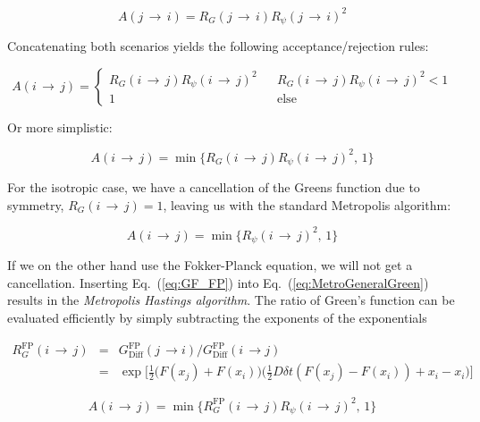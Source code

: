\begin{equation*}
 A(j\,\rightarrow\,i) = R_G(j\,\rightarrow\,i)R_\psi(j\,\rightarrow\,i)^2
\end{equation*}


Concatenating both scenarios yields the following acceptance/rejection rules:

\begin{equation}
\label{eq:MetroGeneralGreen}
 A(i\,\rightarrow\,j) = \left\{\begin{array}{ccc}
R_G(i\,\rightarrow\,j)R_\psi(i\,\rightarrow\,j)^2 & & R_G(i\,\rightarrow\,j)R_\psi(i\,\rightarrow\,j)^2 < 1\\
1  & & \mathrm{else}  \end{array}\right. 
\end{equation}

Or more simplistic:

\begin{equation}
  A(i\,\rightarrow\,j) = \min\{R_G(i\,\rightarrow\,j)R_\psi(i\,\rightarrow\,j)^2, \,1\}
\end{equation}


For the isotropic case, we have a cancellation of the Greens function due to symmetry, $R_G(i\,\rightarrow\,j) = 1$, leaving us with the standard Metropolis algorithm:

\begin{equation}
\label{eq:Metropolis_standard}
 A(i\,\rightarrow\,j) = \min\{R_\psi(i\,\rightarrow\,j)^2, \,1\}
\end{equation}

If we on the other hand use the Fokker-Planck equation, we will not get a cancellation. Inserting Eq.~(\ref{eq:GF_FP}) into Eq.~(\ref{eq:MetroGeneralGreen}) results in the \textit{Metropolis Hastings algorithm}. The ratio of Green's function can be evaluated efficiently by simply subtracting the exponents of the exponentials

\begin{eqnarray}
 R_G^\mathrm{FP}(i\,\rightarrow\,j) &=&G_\mathrm{Diff}^\mathrm{FP}(j\,\rightarrow i)/G_\mathrm{Diff}^\mathrm{FP}(i\,\rightarrow j) \nonumber \\
                                    &=& \exp{\Big[\frac{1}{2}\big(F(x_j) + F(x_i)\big)\big(\frac{1}{2}D\delta t(F(x_j) - F(x_i)) + x_i - x_i\big)\Big]}
\end{eqnarray}

\begin{equation}
\label{eq:MetropolisHastings}
 A(i\,\rightarrow\,j) = \min\{R_G^\mathrm{FP}(i\,\rightarrow\,j)R_\psi(i\,\rightarrow\,j)^2, \,1\}
\end{equation}

